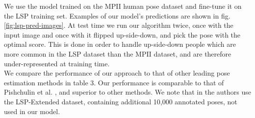 \documentclass{article}
\begin{document}
\begin{table}[]

	\centering
	
	\label{my-label}
	\caption{PCP results on the LSP dataset (PC). }

\end{table} 

We use the model trained on the MPII human pose dataset and fine-tune it on the LSP training set. Examples of our model's predictions are shown in fig. \ref{fig:lsp-pred-images}. At test time we run our algorithm twice, once with the input image and once with it flipped up-side-down, and pick the pose with the optimal score. This is done in order to handle up-side-down people which are more common in the LSP dataset than the MPII dataset, and are therefore under-represented at training time.\\



We compare the performance of our approach to that of other leading pose estimation methods in table 3. Our performance is comparable to that of Pishchulin et al. \cite{pishchulin15}, and  superior to other methods. We note that in \cite{pishchulin15} the authors use the LSP-Extended dataset, containing additional 10,000 annotated poses, not used in our model.
\end{document}
